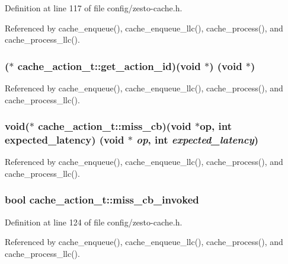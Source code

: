 Definition at line 117 of file config/zesto-cache.h.

Referenced by cache\_\-enqueue(), cache\_\-enqueue\_\-llc(), cache\_\-process(), and cache\_\-process\_\-llc().
\subsubsection[{get\_\-action\_\-id}]{($\ast$ {\bf cache\_\-action\_\-t::get\_\-action\_\-id})(void $\ast$) (void $\ast$)}\label{structcache__action__t_25d37d07cb133e38b42a1759d1dfd7c6}




Referenced by cache\_\-enqueue(), cache\_\-enqueue\_\-llc(), cache\_\-process(), and cache\_\-process\_\-llc().
\subsubsection[{miss\_\-cb}]{\setlength{\rightskip}{0pt plus 5cm}void($\ast$ {\bf cache\_\-action\_\-t::miss\_\-cb})(void $\ast${\bf op}, int expected\_\-latency) (void $\ast$ {\em op}, \/  int {\em expected\_\-latency})}\label{structcache__action__t_faacdd968e8c68b90484069d7c588995}




Referenced by cache\_\-enqueue(), cache\_\-enqueue\_\-llc(), cache\_\-process(), and cache\_\-process\_\-llc().
\subsubsection[{miss\_\-cb\_\-invoked}]{\setlength{\rightskip}{0pt plus 5cm}bool {\bf cache\_\-action\_\-t::miss\_\-cb\_\-invoked}}\label{structcache__action__t_6161a80372672a7f962353008003afa7}




Definition at line 124 of file config/zesto-cache.h.

Referenced by cache\_\-enqueue(), cache\_\-enqueue\_\-llc(), cache\_\-process(), and cache\_\-process\_\-llc().
